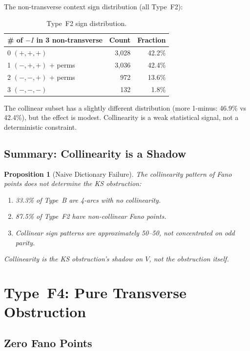 \documentclass[11pt,a4paper]{article}
\newtheorem{proposition}[theorem]{Proposition}
\theoremstyle{remark}
\begin{document}
The non-transverse context sign distribution (all Type~F2):

\begin{table}[h]
\centering
\begin{tabular}{l r r}
\toprule
\# of $-I$ in 3 non-transverse & Count & Fraction \\
\midrule
0 $(+,+,+)$ & 3{,}028 & 42.2\% \\
1 $(-,+,+)$ + perms & 3{,}036 & 42.4\% \\
2 $(-,-,+)$ + perms & 972 & 13.6\% \\
3 $(-,-,-)$ & 132 & 1.8\% \\
\bottomrule
\end{tabular}
\caption{Type~F2 sign distribution.}
\label{tab:type-f2-signs}
\end{table}

The collinear subset has a slightly different distribution (more
1-minus: 46.9\% vs 42.4\%), but the effect is modest. Collinearity
is a weak statistical signal, not a deterministic constraint.

\subsection{Summary: Collinearity is a Shadow}

\begin{proposition}[Naive Dictionary Failure]
\label{prop:naive-failure}
The collinearity pattern of Fano points does \emph{not} determine the
KS obstruction:
\begin{enumerate}
  \item 33.3\% of Type~B are 4-arcs with no collinearity.
  \item 87.5\% of Type~F2 have non-collinear Fano points.
  \item Collinear sign patterns are approximately 50--50, not
    concentrated on odd parity.
\end{enumerate}
Collinearity is the KS obstruction's \emph{shadow} on $V$, not the
obstruction itself.
\end{proposition}

\section{Type~F4: Pure Transverse Obstruction}
\label{sec:type-f4}

\subsection{Zero Fano Points}
\end{document}
